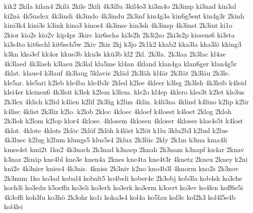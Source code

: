 {    kik2
    2kila
    kilan4
    2kilä
    2kile
    2kili
    4k3illu
    3kil4o3
    ki3m4o
    2k3imp
    ki3nad
    kin3al
    ki2nä
    4k5index
    4k3indi
    4k3indo
    4k3indu
    2k3inf
    kin4g3a
    kin6g5ent
    kin4g3r
    2kinh
    kini3k4
    kini3s
    k3ink
    kino3
    kinos4
    4k3inse
    kin3sh
    4k3insp
    4k3inst
    2k3int
    ki1o
    2kior
    kio2s
    kio2v
    kip4pr
    3kirc
    kir6scha
    ki3s2h
    2k3i2so
    2ki3s2p
    kissens6
    ki3sta
    ki3s4to
    kit6schl
    kit6sch5w
    2kiv
    2kiz
    2kj
    k3jo
    2k1k2
    kkab2
    kka3la
    kka3lö
    kking3
    k3kn
    kko3ef
    kk4or
    kkue3b
    kku3s
    kkü3b
    kl2
    2kl.
    2k3la.
    2k3laa
    2k3lac
    kl4ae
    4k3laed
    4k3laeh
    k3laeu
    2k3lal
    kla5me
    kl4an
    4kland
    klan4ga
    klan6ger
    klan4g5r
    4klat.
    klaue4
    k3lauf
    4k3laug
    5klavie
    2kläd
    2k3läh
    kl4är
    2k3lät
    2k3läu
    2k3le.
    kle5ar.
    kle5ari
    k2leb
    kle4ba
    kle4b3r
    2kled
    k2lee
    4kleer
    k3leg
    2k3leh
    4k3leib
    k4leid
    klei4er
    kleinen6
    4k3leit
    k3lek
    k2lem
    k3lem.
    kle2o
    kl4ep
    4klero
    kles3t
    k2let
    kle3us
    2k3lex
    4klich
    k2lid
    k4lien
    k2lif
    2k3lig
    k2lim
    4klin.
    k4li3na
    4klind
    k4lino
    k2lip
    k2lir
    k4lisc
    4klist
    2k3liz
    k2lo.
    k2lob
    2kloc
    4kloec
    4kloef
    k4loest
    k4loet
    2klog
    2kloh
    2k3lok
    k2lom
    k2lop
    klor4
    4klose.
    4klosem
    4klosen
    4kloser
    4kloses
    klos4s5t
    k4lost
    4klot.
    4klote
    4klots
    2klöc
    2klöf
    2klöh
    k4löst
    k2löt
    k1lu
    3klu2b3
    k2lud
    k2lue
    4k3luec
    k2lug
    k2lum
    klungs5
    klus5s4
    2klux
    2k3lüc
    2kly
    2k1m
    k3ma
    kma4li
    kmes4st
    kmi2t
    1kn2
    4k3nach
    2k3nad
    k3naep
    2knah
    2k3nam
    k3napf
    kn4ar
    2knav
    k3naz
    2knäp
    kne4bl
    kne3e
    knen4a
    2knes
    kne4ta
    kne4t3r
    4knetz
    2kneu
    2kney
    k2ni
    kni2e
    4k3nier
    knies4
    4k3nis.
    4kniss
    2k3niv
    k2no
    kno4b3l
    4knorm
    kno2s
    2k3nov
    2k3num
    1ko
    ko3ad
    kobal4
    kobalt5
    ko4beli
    kober4e
    2k3obj
    kob3la
    kob4sk
    ko3che
    koch3i
    ko3edu
    k5oeffn
    ko3eli
    ko3erh
    ko3erk
    ko3erm
    k3oert
    ko3ev
    ko4fen
    koff6e5i
    4k3offi
    koh3lu
    ko3hö
    2k3ohr
    ko1i
    koka3s4
    kol4a
    ko5lau
    kol3c
    kol2k3
    kol4l5e4b
    kol4lei
}
